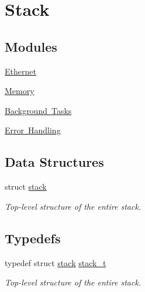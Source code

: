 \hypertarget{group__stack}{}\section{Stack}
\label{group__stack}
\subsection*{Modules}
\begin{DoxyCompactItemize}
\item 
\mbox{\hyperlink{group__ethernet}{Ethernet}}
\item 
\mbox{\hyperlink{group__memory}{Memory}}
\item 
\mbox{\hyperlink{group__background}{Background Tasks}}
\item 
\mbox{\hyperlink{group__error}{Error Handling}}
\end{DoxyCompactItemize}
\subsection*{Data Structures}
\begin{DoxyCompactItemize}
\item 
struct \mbox{\hyperlink{structstack}{stack}}
\begin{DoxyCompactList}\small\item\em Top-\/level structure of the entire stack. \end{DoxyCompactList}\end{DoxyCompactItemize}
\subsection*{Typedefs}
\begin{DoxyCompactItemize}
\item 
typedef struct \mbox{\hyperlink{structstack}{stack}} \mbox{\hyperlink{group__stack_ga575defe06cb6cd9e4b02d90a916721b3}{stack\+\_\+t}}
\begin{DoxyCompactList}\small\item\em Top-\/level structure of the entire stack. \end{DoxyCompactList}\end{DoxyCompactItemize}
